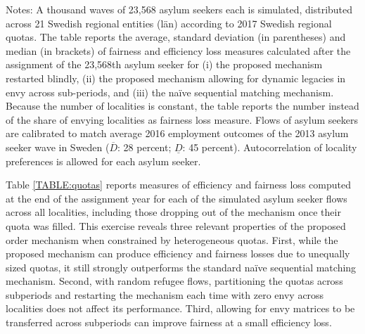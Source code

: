 \documentclass[12pt,fleqn]{article}
\begin{document}
\begin{table}
\caption{ Performance of the assignment algorithm if quotas are split over multiple sub-periods}
\label{TABLE:quotas}
	{\scriptsize \vspace{0.1em}
	\begin{singlespace}
		{\sc Notes:} A thousand waves of 23,568 asylum seekers each is simulated, distributed across 21 Swedish regional entities (l\"{a}n) according to 2017 Swedish regional quotas. The table reports the average, standard deviation (in parentheses) and median (in brackets) of fairness and efficiency loss measures calculated after the assignment of the 23,568th asylum seeker for (i) the proposed mechanism restarted blindly, (ii) the proposed mechanism allowing for dynamic legacies in envy across sub-periods, and (iii) the na\"{i}ve sequential matching mechanism. Because the number of localities is constant, the table reports the number instead of the share of envying localities as fairness loss measure. Flows of asylum seekers are calibrated to match average 2016 employment outcomes of the 2013 asylum seeker wave in Sweden ($\overline{D}$: 28 percent; $\underline{D}$: 45 percent). Autocorrelation of locality preferences is allowed for each asylum seeker.
	\end{singlespace}
	 }
	\end{table}

Table \ref{TABLE:quotas} reports measures of efficiency and fairness loss computed at the end of the assignment year for each of the simulated asylum seeker flows across all localities, including those dropping out of the mechanism once their quota was filled. This exercise reveals three relevant properties of the proposed order mechanism when constrained by heterogeneous quotas. First, while the proposed mechanism can produce efficiency and fairness losses due to unequally sized quotas, it still strongly outperforms the standard na\"{i}ve sequential matching mechanism. Second, with random refugee flows, partitioning the quotas across subperiods and restarting the mechanism each time with zero envy across localities does not affect its performance. Third, allowing for envy matrices to be transferred across subperiods can improve fairness at a small efficiency loss.
\end{document}
